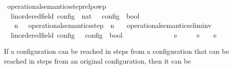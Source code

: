 \begin{isabellebody}
\isanewline
{}\isamarkupfalse%
\ operational{\isacharunderscore}semantics{\isacharunderscore}step{\isacharunderscore}relpowp\isanewline
\ \ {\isacharcolon}{\isacharcolon}{\isacartoucheopen}{\isacharparenleft}{\isacharprime}{\isasymtau}{\isacharcolon}{\isacharcolon}linordered{\isacharunderscore}field{\isacharparenright}\ config\ {\isasymRightarrow}\ nat\ {\isasymRightarrow}\ {\isacharprime}{\isasymtau}\ config\ {\isasymRightarrow}\ bool{\isacartoucheclose}\ \ \ \ \ \ \ {\isacharparenleft}{\isachardoublequoteopen}{\isacharunderscore}\ {\isasymhookrightarrow}\isactrlbsup {\isacharunderscore}\isactrlesup \ {\isacharunderscore}{\isachardoublequoteclose}\ {}{}{\isacharparenright}\isanewline
{}\isanewline
\ \ {\isacartoucheopen}{\isasymC}\ {\isasymhookrightarrow}\isactrlbsup n\isactrlesup \ {\isasymC}\ {\isasymequiv}\ {\isacharparenleft}operational{\isacharunderscore}semantics{\isacharunderscore}step\ {\isacharcircum}{\isacharcircum}\ n{\isacharparenright}\ {\isasymC}\ {\isasymC}\isanewline
\isanewline
{}\isamarkupfalse%
\ operational{\isacharunderscore}semantics{\isacharunderscore}elim{\isacharunderscore}inv\isanewline
\ \ {\isacharcolon}{\isacharcolon}{\isacartoucheopen}{\isacharparenleft}{\isacharprime}{\isasymtau}{\isacharcolon}{\isacharcolon}linordered{\isacharunderscore}field{\isacharparenright}\ config\ {\isasymRightarrow}\ {\isacharprime}{\isasymtau}\ config\ {\isasymRightarrow}\ bool{\isacartoucheclose}\ \ \ \ \ \ \ \ \ \ \ \ \ \ {\isacharparenleft}{\isachardoublequoteopen}{\isacharunderscore}\ {\isasymhookrightarrow}\isactrlsub e\isactrlsup {\isasymleftarrow}\ {\isacharunderscore}{\isachardoublequoteclose}\ {}{}{\isacharparenright}\isanewline
{}\isanewline
\ \ {\isacartoucheopen}{\isasymC}\ {\isasymhookrightarrow}\isactrlsub e\isactrlsup {\isasymleftarrow}\ {\isasymC}\ {\isasymequiv}\ {\isasymC}\ {\isasymhookrightarrow}\isactrlsub e\ {\isasymC}%
\isadelimdocument
%
\endisadelimdocument
%
\isatagdocument
%
\isamarkuptrue%
%
\endisatagdocument
{\isafolddocument}%
%
\isadelimdocument
%
\endisadelimdocument
%
\begin{isamarkuptext}%
If a configuration can be reached in  steps from a configuration that 
  can be reached in  steps from an original configuration, then it can be 

\end{isamarkuptext}
\end{isabellebody}
